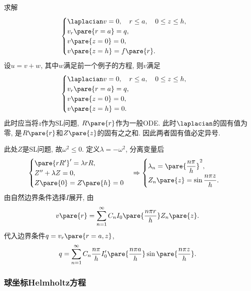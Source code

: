 \documentclass[hidelinks]{ctexart}
\begin{document}
\begin{sample}
    \begin{ex}
        求解
        \[ \begin{cases}
            \laplacian v = 0, \quad r\le a,\quad 0\le z\le h, \\
            v_r\pare{r=a} = q, \\
            v\pare{z=0} = 0, \\
            v\pare{z=h} = f\pare{r}.
        \end{cases} \]
        设$u=v+w$, 其中$w$满足前一个例子的方程, 则$v$满足
        \[ \begin{cases}
            \laplacian v = 0,\quad r\le a,\quad 0\le z\le h, \\
            v_r\pare{r=a} = q,\\
            v\pare{z=0} = 0,\\
            v\pare{z=h} = 0.
        \end{cases} \]
        此时应当将$z$作为SL问题, $R\pare{r}$作为一般ODE. 此时$\laplacian$的固有值为零, 是$R\pare{r}$和$Z\pare{z}$的固有之之和. 因此两者固有值必定异号.
        \par
        此处$Z$是SL问题, 故$\omega^2 \le 0$. 定义$\lambda = -\omega^2$, 分离变量后
        \[ \begin{cases}
            \pare{rR'}' = \lambda rR, \\
            Z'' + \lambda Z = 0, \\
            Z\pare{0} = Z\pare{h} = 0
        \end{cases} \Rightarrow \begin{cases}
            \displaystyle \lambda_n = \pare{\frac{n\pi}{h}}^2, \\[0.5em]
            \displaystyle Z_n\pare{z} = \sin \frac{n\pi z}{h}.
        \end{cases} \]
        由自然边界条件选择$I$展开, 由
        \[ v\pare{r} = \sum_{n=1}^\infty C_n I_0\pare{\frac{n\pi r}{h}}Z_n\pare{z}. \]
        代入边界条件$q = v_r\pare{r=a,z}$,
        \[ q = \sum_{n=1}^\infty C_n \frac{n\pi}{h} I'_0\pare{\frac{n\pi a}{h}}\sin \pare{\frac{n\pi z}{h}}. \]
    \end{ex}
\end{sample}

\subsubsection{球坐标Helmholtz方程} %
\label{ssub:球坐标helmholtz方程}
\end{document}
